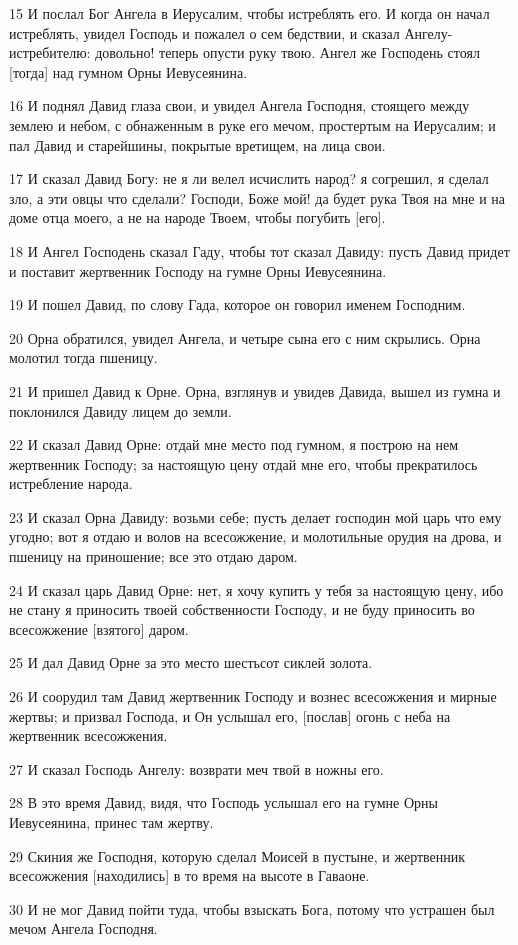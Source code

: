 \par 15 И послал Бог Ангела в Иерусалим, чтобы истреблять его. И когда он начал истреблять, увидел Господь и пожалел о сем бедствии, и сказал Ангелу-истребителю: довольно! теперь опусти руку твою. Ангел же Господень стоял [тогда] над гумном Орны Иевусеянина.
\par 16 И поднял Давид глаза свои, и увидел Ангела Господня, стоящего между землею и небом, с обнаженным в руке его мечом, простертым на Иерусалим; и пал Давид и старейшины, покрытые вретищем, на лица свои.
\par 17 И сказал Давид Богу: не я ли велел исчислить народ? я согрешил, я сделал зло, а эти овцы что сделали? Господи, Боже мой! да будет рука Твоя на мне и на доме отца моего, а не на народе Твоем, чтобы погубить [его].
\par 18 И Ангел Господень сказал Гаду, чтобы тот сказал Давиду: пусть Давид придет и поставит жертвенник Господу на гумне Орны Иевусеянина.
\par 19 И пошел Давид, по слову Гада, которое он говорил именем Господним.
\par 20 Орна обратился, увидел Ангела, и четыре сына его с ним скрылись. Орна молотил тогда пшеницу.
\par 21 И пришел Давид к Орне. Орна, взглянув и увидев Давида, вышел из гумна и поклонился Давиду лицем до земли.
\par 22 И сказал Давид Орне: отдай мне место под гумном, я построю на нем жертвенник Господу; за настоящую цену отдай мне его, чтобы прекратилось истребление народа.
\par 23 И сказал Орна Давиду: возьми себе; пусть делает господин мой царь что ему угодно; вот я отдаю и волов на всесожжение, и молотильные орудия на дрова, и пшеницу на приношение; все это отдаю даром.
\par 24 И сказал царь Давид Орне: нет, я хочу купить у тебя за настоящую цену, ибо не стану я приносить твоей собственности Господу, и не буду приносить во всесожжение [взятого] даром.
\par 25 И дал Давид Орне за это место шестьсот сиклей золота.
\par 26 И соорудил там Давид жертвенник Господу и вознес всесожжения и мирные жертвы; и призвал Господа, и Он услышал его, [послав] огонь с неба на жертвенник всесожжения.
\par 27 И сказал Господь Ангелу: возврати меч твой в ножны его.
\par 28 В это время Давид, видя, что Господь услышал его на гумне Орны Иевусеянина, принес там жертву.
\par 29 Скиния же Господня, которую сделал Моисей в пустыне, и жертвенник всесожжения [находились] в то время на высоте в Гаваоне.
\par 30 И не мог Давид пойти туда, чтобы взыскать Бога, потому что устрашен был мечом Ангела Господня.

